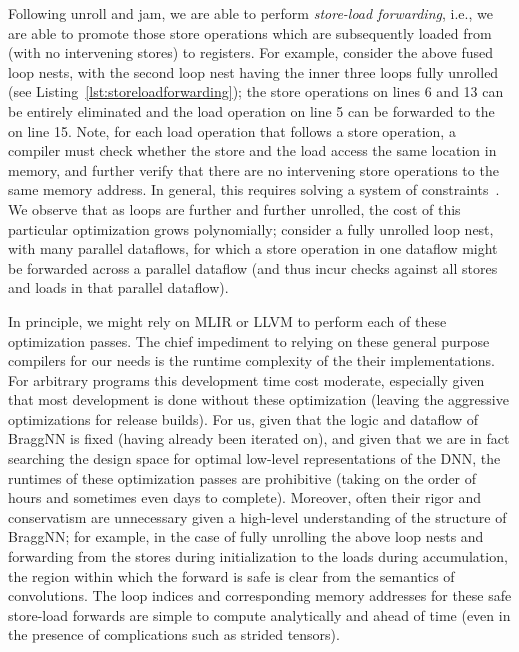 Following unroll and jam, we are able to perform \emph{store-load forwarding}, i.e., we are able to promote those store operations which are subsequently loaded from (with no intervening stores) to registers.
For example, consider the above fused loop nests, with the second loop nest having the inner three loops fully unrolled (see Listing~\ref{lst:storeloadforwarding}); the store operations on lines 6 and 13 can be entirely eliminated and the load operation on line 5 can be forwarded to the  on line 15.
Note, for each load operation that follows a store operation, a compiler must check whether the store and the load access the same location in memory, and further verify that there are no intervening store operations to the same memory address.
In general, this requires solving a system of constraints~\cite{10.2307/2322281}.
We observe that as loops are further and further unrolled, the cost of this particular optimization grows polynomially; consider a fully unrolled loop nest, with many parallel dataflows, for which a store operation in one dataflow might be forwarded across a parallel dataflow (and thus incur checks against all stores and loads in that parallel dataflow).

In principle, we might rely on MLIR or LLVM to perform each of these optimization passes.
The chief impediment to relying on these general purpose compilers for our needs is the runtime complexity of the their implementations.
For arbitrary programs this development time cost moderate, especially given that most development is done without these optimization (leaving the aggressive optimizations for release builds).
For us, given that the logic and dataflow of BraggNN is fixed (having already been iterated on), and given that we are in fact searching the design space for optimal low-level representations of the DNN, the runtimes of these optimization passes are prohibitive (taking on the order of hours and sometimes even days to complete).
Moreover, often their rigor and conservatism are unnecessary given a high-level understanding of the structure of BraggNN; for example, in the case of fully unrolling the above loop nests and forwarding from the stores during initialization to the loads during accumulation, the region within which the forward is safe is clear from the semantics of convolutions.
The loop indices and corresponding memory addresses for these safe store-load forwards are simple to compute analytically and ahead of time (even in the presence of complications such as strided tensors).

